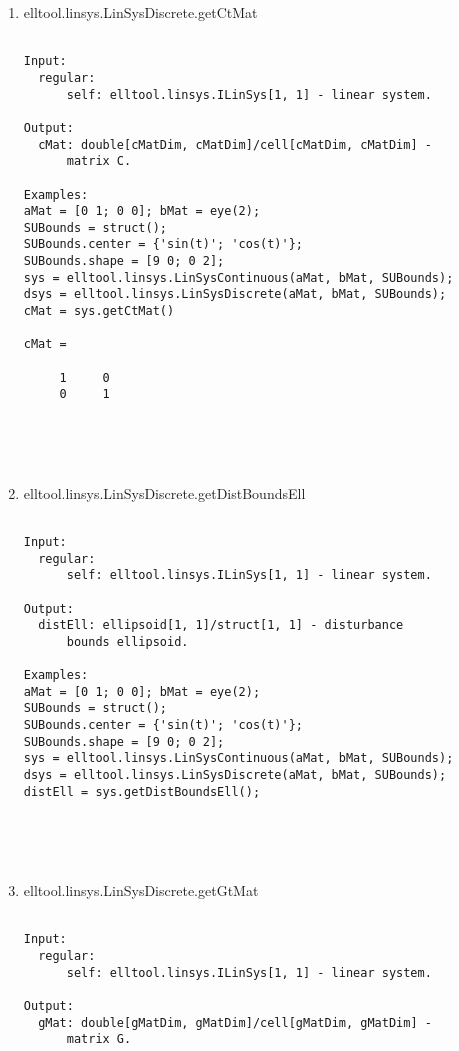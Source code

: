 \begin{enumerate}
\begin{lstlisting}
\end{lstlisting}
\fontfamily{\familydefault}
\selectfont
\item {elltool.linsys.LinSysDiscrete.getCtMat}
\selectfont
\begin{lstlisting}

Input:
  regular:
      self: elltool.linsys.ILinSys[1, 1] - linear system.

Output:
  cMat: double[cMatDim, cMatDim]/cell[cMatDim, cMatDim] -
      matrix C.

Examples:
aMat = [0 1; 0 0]; bMat = eye(2);
SUBounds = struct();
SUBounds.center = {'sin(t)'; 'cos(t)'};
SUBounds.shape = [9 0; 0 2];
sys = elltool.linsys.LinSysContinuous(aMat, bMat, SUBounds);
dsys = elltool.linsys.LinSysDiscrete(aMat, bMat, SUBounds);
cMat = sys.getCtMat()

cMat =

     1     0
     0     1





\end{lstlisting}
\fontfamily{\familydefault}
\selectfont
\item {elltool.linsys.LinSysDiscrete.getDistBoundsEll}
\selectfont
\begin{lstlisting}

Input:
  regular:
      self: elltool.linsys.ILinSys[1, 1] - linear system.

Output:
  distEll: ellipsoid[1, 1]/struct[1, 1] - disturbance
      bounds ellipsoid.

Examples:
aMat = [0 1; 0 0]; bMat = eye(2);
SUBounds = struct();
SUBounds.center = {'sin(t)'; 'cos(t)'};
SUBounds.shape = [9 0; 0 2];
sys = elltool.linsys.LinSysContinuous(aMat, bMat, SUBounds);
dsys = elltool.linsys.LinSysDiscrete(aMat, bMat, SUBounds);
distEll = sys.getDistBoundsEll();





\end{lstlisting}
\fontfamily{\familydefault}
\selectfont
\item {elltool.linsys.LinSysDiscrete.getGtMat}
\selectfont
\begin{lstlisting}

Input:
  regular:
      self: elltool.linsys.ILinSys[1, 1] - linear system.

Output:
  gMat: double[gMatDim, gMatDim]/cell[gMatDim, gMatDim] -
      matrix G.


\end{lstlisting}
\end{enumerate}
